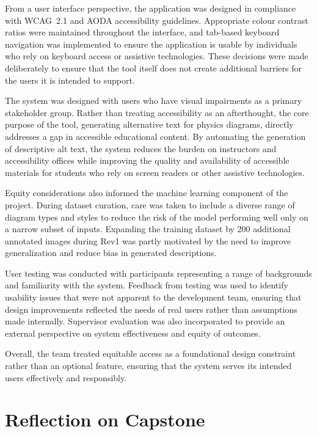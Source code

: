 \documentclass{article}
\begin{document}
From a user interface perspective, the application was designed in compliance with 
WCAG~2.1 and AODA accessibility guidelines. Appropriate colour contrast ratios were 
maintained throughout the interface, and tab-based keyboard navigation was 
implemented to ensure the application is usable by individuals who rely on keyboard 
access or assistive technologies. These decisions were made deliberately to ensure 
that the tool itself does not create additional barriers for the users it is intended 
to support.

The system was designed with users who have visual impairments as a primary 
stakeholder group. Rather than treating accessibility as an afterthought, the core 
purpose of the tool, generating alternative text for physics diagrams, directly 
addresses a gap in accessible educational content. By automating the generation of 
descriptive alt text, the system reduces the burden on instructors and accessibility 
offices while improving the quality and availability of accessible materials for 
students who rely on screen readers or other assistive technologies.

Equity considerations also informed the machine learning component of the project. 
During dataset curation, care was taken to include a diverse range of diagram types 
and styles to reduce the risk of the model performing well only on a narrow subset 
of inputs. Expanding the training dataset by 200 additional annotated images during 
Rev1 was partly motivated by the need to improve generalization and reduce bias in 
generated descriptions.

User testing was conducted with participants representing a range of backgrounds and 
familiarity with the system. Feedback from testing was used to identify usability 
issues that were not apparent to the development team, ensuring that design 
improvements reflected the needs of real users rather than assumptions made 
internally. Supervisor evaluation was also incorporated to provide an external 
perspective on system effectiveness and equity of outcomes.

Overall, the team treated equitable access as a foundational design constraint 
rather than an optional feature, ensuring that the system serves its intended 
users effectively and responsibly.

\section{Reflection on Capstone}
\end{document}
